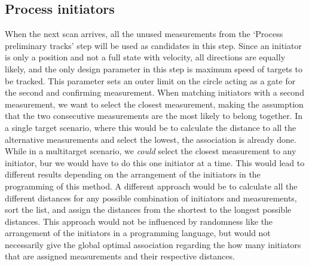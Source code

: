 \subsection{Process initiators}
When the next scan arrives, all the unused measurements from the `Process preliminary tracks' step will be used as candidates in this step. Since an initiator is only a position and not a full state with velocity, all directions are equally likely, and the only design parameter in this step is maximum speed of targets to be tracked. This parameter sets an outer limit on the circle acting as a gate for the second and confirming measurement. When matching initiators with a second measurement, we want to select the closest measurement, making the assumption that the two consecutive measurements are the most likely to belong together. In a single target scenario, where this would be to calculate the distance to all the alternative measurements and select the lowest, the association is already done. While in a multitarget scenario, we \emph{could} select the closest measurement to any initiator, bur we would have to do this one initiator at a time. This would lead to different results depending on the arrangement of the initiators in the programming of this method. A different approach would be to calculate all the different distances for any possible combination of initiators and measurements, sort the list, and assign the distances from the shortest to the longest possible distances. This approach would not be influenced by randomness like the arrangement of the initiators in a programming language, but would not necessarily give the global optimal association regarding the how many initiators that are assigned measurements and their respective distances.

